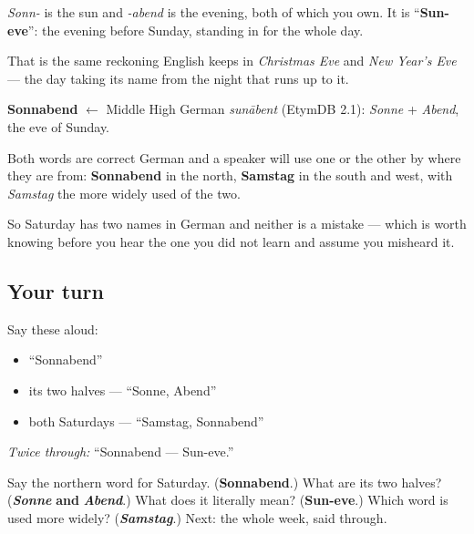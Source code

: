 \emph{Sonn-} is the sun and \emph{-abend} is the evening, both of which you own. It is \textquotedblleft{}\textbf{Sun-eve}\textquotedblright{}: the evening before Sunday, standing in for the whole day.

That is the same reckoning English keeps in \emph{Christmas Eve} and \emph{New Year's Eve} — the day taking its name from the night that runs up to it.

\begin{cousinweb}
\textbf{Sonnabend} $\leftarrow$ Middle High German \emph{sunābent} (EtymDB 2.1): \emph{Sonne} + \emph{Abend}, the eve of Sunday.
\end{cousinweb}

\begin{culture}
Both words are correct German and a speaker will use one or the other by where they are from: \textbf{Sonnabend} in the north, \textbf{Samstag} in the south and west, with \emph{Samstag} the more widely used of the two.

So Saturday has two names in German and neither is a mistake — which is worth knowing before you hear the one you did not learn and assume you misheard it.
\end{culture}

\subsection*{Your turn}
Say these aloud:

\begin{itemize}
\raggedright
  \item \textquotedblleft{}Sonnabend\textquotedblright{}
  \item its two halves — \textquotedblleft{}Sonne, Abend\textquotedblright{}
  \item both Saturdays — \textquotedblleft{}Samstag, Sonnabend\textquotedblright{}
\end{itemize}

\emph{Twice through:} \textquotedblleft{}Sonnabend — Sun-eve.\textquotedblright{}

\begin{tcolorbox}[breakable,colback=teal!4,colframe=teal!35!black,title={Before you move on}]
Say the northern word for Saturday. (\textbf{Sonnabend}.) What are its two halves? (\emph{\textbf{Sonne}} \textbf{and} \emph{\textbf{Abend}}.) What does it literally mean? (\textbf{Sun-eve}.) Which word is used more widely? (\emph{\textbf{Samstag}}.) Next: the whole week, said through.
\end{tcolorbox}
